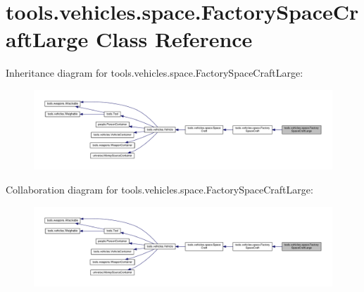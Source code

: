 \hypertarget{classtools_1_1vehicles_1_1space_1_1_factory_space_craft_large}{}\section{tools.\+vehicles.\+space.\+Factory\+Space\+Craft\+Large Class Reference}
\label{classtools_1_1vehicles_1_1space_1_1_factory_space_craft_large}


Inheritance diagram for tools.\+vehicles.\+space.\+Factory\+Space\+Craft\+Large\+:
\nopagebreak
\begin{figure}[H]
\begin{center}
\leavevmode
\includegraphics[width=350pt]{classtools_1_1vehicles_1_1space_1_1_factory_space_craft_large__inherit__graph}
\end{center}
\end{figure}


Collaboration diagram for tools.\+vehicles.\+space.\+Factory\+Space\+Craft\+Large\+:
\nopagebreak
\begin{figure}[H]
\begin{center}
\leavevmode
\includegraphics[width=350pt]{classtools_1_1vehicles_1_1space_1_1_factory_space_craft_large__coll__graph}
\end{center}
\end{figure}
